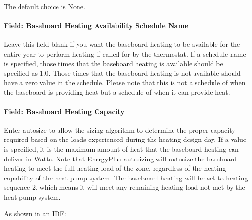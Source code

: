 The default choice is None.

\paragraph{Field: Baseboard Heating Availability Schedule Name}\label{field-baseboard-heating-availability-schedule-name-4}

Leave this field blank if you want the baseboard heating to be available for the entire year to perform heating if called for by the thermostat. If a schedule name is specified, those times that the baseboard heating is available should be specified as 1.0. Those times that the baseboard heating is not available should have a zero value in the schedule. Please note that this is not a schedule of when the baseboard is providing heat but a schedule of when it can provide heat.

\paragraph{Field: Baseboard Heating Capacity}\label{field-baseboard-heating-capacity-4}

Enter autosize to allow the sizing algorithm to determine the proper capacity required based on the loads experienced during the heating design day. If a value is specified, it is the maximum amount of heat that the baseboard heating can deliver in Watts. Note that EnergyPlus autosizing will autosize the baseboard heating to meet the full heating load of the zone, regardless of the heating capability of the heat pump system. The baseboard heating will be set to heating sequence 2, which means it will meet any remaining heating load not met by the heat pump system.

As shown in an IDF:

